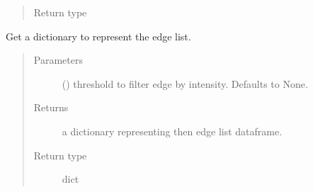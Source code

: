 \documentclass[letterpaper,10pt,english]{sphinxmanual}
\begin{document}
\begin{fulllineitems}
\begin{fulllineitems}
\begin{quote}
\begin{description}
\item[{Return type}] \leavevmode
{\hyperref[\detokenize{_modules/cosifer.collections:cosifer.collections.interaction_table.InteractionTable}]{}}

\end{description}\end{quote}

\end{fulllineitems}


\begin{fulllineitems}
\label{\detokenize{_modules/cosifer.collections:cosifer.collections.interaction_table.InteractionTable.get_df_dict}}
Get a dictionary to represent the edge list.
\begin{quote}\begin{description}
\item[{Parameters}] \leavevmode
{} (\sphinxstyleliteralemphasis{\sphinxupquote{, }}) \textendash{} threshold to filter edge by
intensity. Defaults to None.

\item[{Returns}] \leavevmode
a dictionary representing then edge list dataframe.

\item[{Return type}] \leavevmode
dict

\end{description}\end{quote}

\end{fulllineitems}



\end{fulllineitems}
\end{document}
